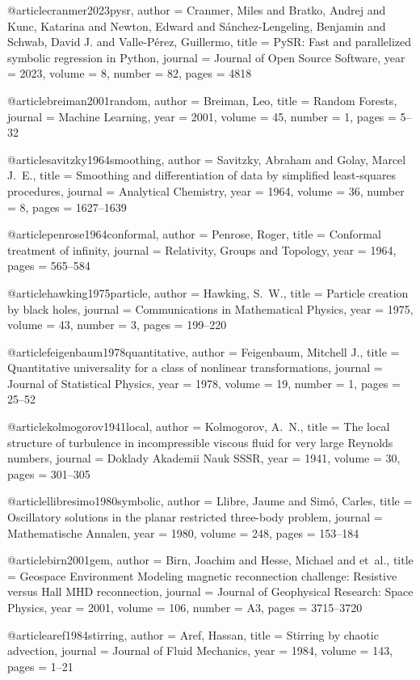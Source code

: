 \documentclass[11pt]{article}
\begin{document}
@article{cranmer2023pysr,
  author  = {Cranmer, Miles and Bratko, Andrej and Kunc, Katarina and Newton, Edward and
             S{\'a}nchez-Lengeling, Benjamin and Schwab, David J. and Valle-P{\'e}rez, Guillermo},
  title   = {{PySR}: Fast and parallelized symbolic regression in Python},
  journal = {Journal of Open Source Software},
  year    = {2023},
  volume  = {8},
  number  = {82},
  pages   = {4818}
}

@article{breiman2001random,
  author  = {Breiman, Leo},
  title   = {Random Forests},
  journal = {Machine Learning},
  year    = {2001},
  volume  = {45},
  number  = {1},
  pages   = {5--32}
}

@article{savitzky1964smoothing,
  author  = {Savitzky, Abraham and Golay, Marcel J.~E.},
  title   = {Smoothing and differentiation of data by simplified least‐squares procedures},
  journal = {Analytical Chemistry},
  year    = {1964},
  volume  = {36},
  number  = {8},
  pages   = {1627--1639}
}

@article{penrose1964conformal,
  author  = {Penrose, Roger},
  title   = {Conformal treatment of infinity},
  journal = {Relativity, Groups and Topology},
  year    = {1964},
  pages   = {565--584}
}

@article{hawking1975particle,
  author  = {Hawking, S.~W.},
  title   = {Particle creation by black holes},
  journal = {Communications in Mathematical Physics},
  year    = {1975},
  volume  = {43},
  number  = {3},
  pages   = {199--220}
}

@article{feigenbaum1978quantitative,
  author  = {Feigenbaum, Mitchell J.},
  title   = {Quantitative universality for a class of nonlinear transformations},
  journal = {Journal of Statistical Physics},
  year    = {1978},
  volume  = {19},
  number  = {1},
  pages   = {25--52}
}

@article{kolmogorov1941local,
  author  = {Kolmogorov, A.~N.},
  title   = {The local structure of turbulence in incompressible viscous fluid for very large Reynolds numbers},
  journal = {Doklady Akademii Nauk SSSR},
  year    = {1941},
  volume  = {30},
  pages   = {301--305}
}

@article{llibresimo1980symbolic,
  author  = {Llibre, Jaume and Sim{\'o}, Carles},
  title   = {Oscillatory solutions in the planar restricted three-body problem},
  journal = {Mathematische Annalen},
  year    = {1980},
  volume  = {248},
  pages   = {153--184}
}

@article{birn2001gem,
  author  = {Birn, Joachim and Hesse, Michael and et~al.},
  title   = {Geospace Environment Modeling magnetic reconnection challenge: Resistive versus Hall MHD reconnection},
  journal = {Journal of Geophysical Research: Space Physics},
  year    = {2001},
  volume  = {106},
  number  = {A3},
  pages   = {3715--3720}
}

@article{aref1984stirring,
  author  = {Aref, Hassan},
  title   = {Stirring by chaotic advection},
  journal = {Journal of Fluid Mechanics},
  year    = {1984},
  volume  = {143},
  pages   = {1--21}
}

% 
% 
\end{document}
